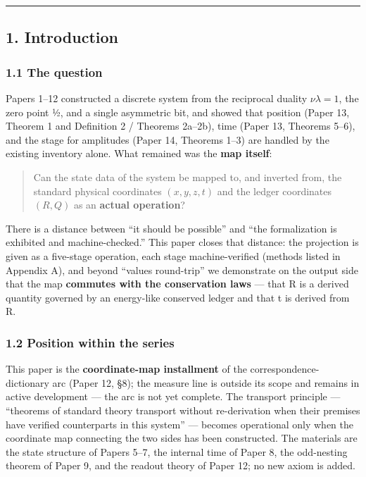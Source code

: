 \documentclass[
]{article}
\begin{document}
\begin{center}\rule{0.5\linewidth}{0.5pt}\end{center}

\subsection{1. Introduction}\label{introduction}

\subsubsection{1.1 The question}\label{the-question}

Papers 1--12 constructed a discrete system from the reciprocal duality
\(\nu\lambda=1\), the zero point ½, and a single asymmetric bit, and
showed that position (Paper 13, Theorem 1 and Definition 2 / Theorems
2a--2b), time (Paper 13, Theorems 5--6), and the stage for amplitudes
(Paper 14, Theorems 1--3) are handled by the existing inventory alone.
What remained was the \textbf{map itself}:

\begin{quote}
Can the state data of the system be mapped to, and inverted from, the
standard physical coordinates \((x,y,z,t)\) and the ledger coordinates
\((R,Q)\) as an \textbf{actual operation}?
\end{quote}

There is a distance between ``it should be possible'' and ``the
formalization is exhibited and machine-checked.'' This paper closes that
distance: the projection is given as a five-stage operation, each stage
machine-verified (methods listed in Appendix A), and beyond ``values
round-trip'' we demonstrate on the output side that the map
\textbf{commutes with the conservation laws} --- that R is a derived
quantity governed by an energy-like conserved ledger and that t is
derived from R.

\subsubsection{1.2 Position within the
series}\label{position-within-the-series}

This paper is the \textbf{coordinate-map installment} of the
correspondence-dictionary arc (Paper 12, §8); the measure line is
outside its scope and remains in active development --- the arc is not
yet complete. The transport principle --- ``theorems of standard theory
transport without re-derivation when their premises have verified
counterparts in this system'' --- becomes operational only when the
coordinate map connecting the two sides has been constructed. The
materials are the state structure of Papers 5--7, the internal time of
Paper 8, the odd-nesting theorem of Paper 9, and the readout theory of
Paper 12; no new axiom is added.
\end{document}

